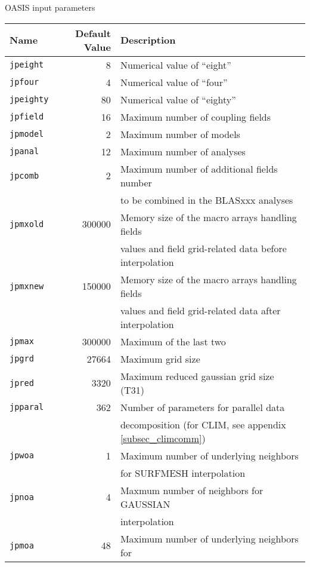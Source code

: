 \begin{subsection}{OASIS input parameters}
\label{subsec_parameters}

\begin{table}[hbtp]
\begin{center}
\begin{tabular}{|lrl|}
\hline
  Name & Default Value & Description \\
\hline
\hline
  {\tt jpeight}     &  8 & Numerical value of ``eight'' \\
  {\tt jpfour}     &  4 & Numerical value of ``four'' \\
  {\tt jpeighty}     &  80 & Numerical value of ``eighty'' \\
  {\tt jpfield}     &  16 & Maximum number of coupling fields\\
  {\tt jpmodel}     &  2 & Maximum number of models\\
  {\tt jpanal }     & 12 & Maximum number of analyses\\
  {\tt jpcomb }     &  2 & Maximum number of additional fields number \\
 &  & to be combined in the BLASxxx analyses \\
  {\tt jpmxold}     & 300000 & Memory size of the macro arrays handling fields\\
 &  & values  and field grid-related data before interpolation \\
  {\tt jpmxnew}     & 150000 & Memory size of the macro arrays handling fields\\
 &  & values and field grid-related data after interpolation \\
  {\tt jpmax  }     & 300000 & Maximum of the last two \\
  {\tt jpgrd  }     & 27664  & Maximum grid size \\
  {\tt jpred  }     & 3320   & Maximum reduced gaussian grid size (T31) \\
  {\tt jpparal}     & 362 & Number of parameters for parallel data\\
 &  & decomposition (for CLIM, see appendix \ref{subsec_climcomm}) \\
  {\tt jpwoa  }     & 1 & Maximum number of underlying neighbors \\
 &  & for SURFMESH interpolation \\
  {\tt jpnoa  }     & 4 & Maxmum number of neighbors for GAUSSIAN \\
 &  & interpolation \\
  {\tt jpmoa  }     & 48 & Maximum number of underlying neighbors for \\

\end{tabular}
\end{center}
\end{table}
\end{subsection}

